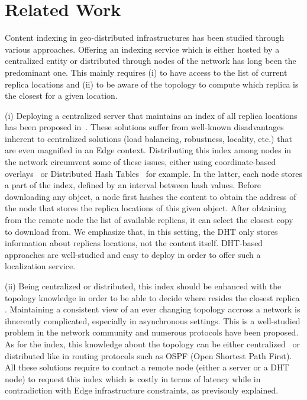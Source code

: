 
\vfill
{}
\newpage

\section{Related Work}
\label{sec:related_work}
Content indexing in geo-distributed infrastructures has been studied through various approaches. 
Offering an indexing service which is either hosted by a centralized entity or distributed through nodes of the network has long been the predominant one. This mainly requires (i) to have access to the list of current replica locations and (ii) to be aware of the topology to compute which replica is the closest for a given location. 

(i) Deploying a centralized server that maintains an index of all replica locations has been proposed in~\cite{fogstore, p2p-alto, p2p-oracle, snamp}. These solutions suffer from well-known disadvantages inherent to centralized solutions (load balancing, robustness, locality, etc.) that are even magnified in an Edge context.
Distributing this index among nodes in the network circumvent some of these issues, either using coordinate-based overlays~\cite{coin_19, voronet} or Distributed Hash Tables~\cite{squirrel, ipfs, mdht} for example. In the latter, each node stores a part of the index, defined by an interval between hash values. 
Before downloading any object, a node first
hashes the content to obtain the address of the node that stores the replica locations of this given object. After obtaining from the remote node the list of available replicas, it can select the closest copy to download from. We emphasize that, in this setting, the DHT only stores information about replicas locations, not the content itself. DHT-based approaches are well-studied and easy to deploy in order to offer such a localization service. 


(ii) Being centralized or distributed, this index should be enhanced with the topology knowledge in order to be able to decide where resides the closest replica . Maintaining a consistent view of an ever changing topology accross a network is ihnerently complicated, especially in asynchronous settings. This is a well-studied problem in the network community and numerous protocols have been proposed. As for the index, this knowledge about the topology can be either centralized~\cite{topology-discovery} or distributed like in routing protocols such as OSPF (Open Shortest Path First).
All these solutions require to contact a remote node (either a server or a DHT node) to request this index 
which is costly in terms of latency while in contradiction with Edge infrastructure constraints, as previsouly explained.


